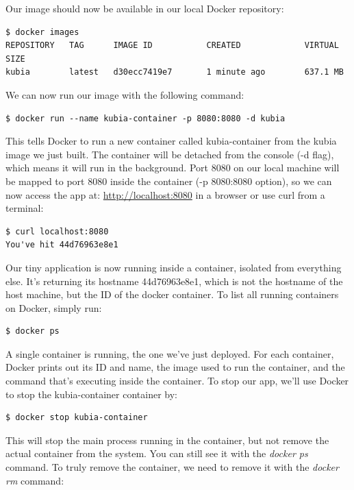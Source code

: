 \documentclass[a4paper,10pt]{article}
\begin{document}
Our image should now be available in our local Docker repository:

\begin{lstlisting}[numbers=none, basicstyle=\ttfamily]
$ docker images
REPOSITORY   TAG      IMAGE ID           CREATED             VIRTUAL SIZE
kubia        latest   d30ecc7419e7       1 minute ago        637.1 MB
\end{lstlisting}

We can now run our image with the following command:

\begin{lstlisting}[numbers=none, basicstyle=\ttfamily]
$ docker run --name kubia-container -p 8080:8080 -d kubia
\end{lstlisting}

This tells Docker to run a new container called kubia-container from the kubia image we just built. The container will be detached from the console (-d flag), which means it will run in the background. Port 8080 on our local machine will be mapped to port 8080 inside the container (-p 8080:8080 option), so we can now access the app at: \url{http://localhost:8080} in a browser or use curl from a terminal:

\begin{lstlisting}[numbers=none, basicstyle=\ttfamily]
$ curl localhost:8080
You've hit 44d76963e8e1
\end{lstlisting}

Our tiny application is now running inside a container, isolated from everything else. It's returning its hostname 44d76963e8e1, which is not the hostname of the host machine, but the ID of the docker container. To list all running containers on Docker, simply run:

\begin{lstlisting}[numbers=none, basicstyle=\ttfamily]
$ docker ps
\end{lstlisting}

A single container is running, the one we've just deployed. For each container, Docker prints out its ID and name, the image used to run the container, and the command that's executing inside the container. To stop our app, we'll use Docker to stop the kubia-container container by:

\begin{lstlisting}[numbers=none, basicstyle=\ttfamily]
$ docker stop kubia-container
\end{lstlisting}

This will stop the main process running in the container, but not remove the actual container from the system. You can still see it with the\textit{ docker ps} command. To truly remove the container, we need to remove it with the \textit{docker rm} command:
\end{document}
